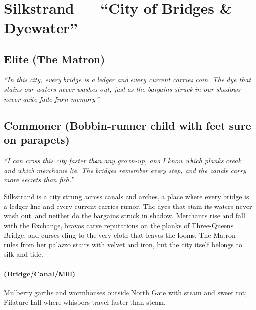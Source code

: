 \section{Silkstrand --- ``City of Bridges \& Dyewater''}
\label{chap:silkstrand}

\subsection*{Elite (The Matron)}
\textit{``In this city, every bridge is a ledger and every current carries coin. The dye that stains our waters never washes out, just as the bargains struck in our shadows never quite fade from memory.''}

\subsection*{Commoner (Bobbin-runner child with feet sure on parapets)}
\textit{``I can cross this city faster than any grown-up, and I know which planks creak and which merchants lie. The bridges remember every step, and the canals carry more secrets than fish.''}


\begin{tcolorbox}[colback=black!3,colframe=black!40!white,title={Theme \& Atmosphere}]
Silkstrand is a city strung across canals and arches, a place where every bridge is a ledger line and every current carries rumor. The dyes that stain its waters never wash out, and neither do the bargains struck in shadow. Merchants rise and fall with the Exchange, bravos carve reputations on the planks of Three-Queens Bridge, and curses cling to the very cloth that leaves the looms. The Matron rules from her palazzo stairs with velvet and iron, but the city itself belongs to silk and tide.
\end{tcolorbox}

\paragraph*{(Bridge/Canal/Mill)} Mulberry garths and wormhouses outside North Gate with steam and sweet rot; Filature hall where whispers travel faster than steam.

